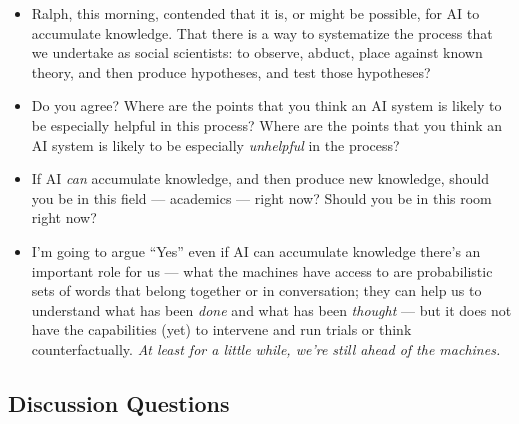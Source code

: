 \documentclass[
  letterpaper,
  DIV=11,
  numbers=noendperiod]{scrreprt}
\begin{document}
\begin{itemize}
\item
  Ralph, this morning, contended that it is, or might be possible, for
  AI to accumulate knowledge. That there is a way to systematize the
  process that we undertake as social scientists: to observe, abduct,
  place against known theory, and then produce hypotheses, and test
  those hypotheses?
\item
  Do you agree? Where are the points that you think an AI system is
  likely to be especially helpful in this process? Where are the points
  that you think an AI system is likely to be especially
  \emph{unhelpful} in the process?
\item
  If AI \emph{can} accumulate knowledge, and then produce new knowledge,
  should you be in this field --- academics --- right now? Should you be
  in this room right now?
\item
  I'm going to argue ``Yes'' even if AI can accumulate knowledge there's
  an important role for us --- what the machines have access to are
  probabilistic sets of words that belong together or in conversation;
  they can help us to understand what has been \emph{done} and what has
  been \emph{thought} --- but it does not have the capabilities (yet) to
  intervene and run trials or think counterfactually. \emph{At least for
  a little while, we're still ahead of the machines.}
\end{itemize}

\subsection{Discussion Questions}\label{discussion-questions}
\end{document}
